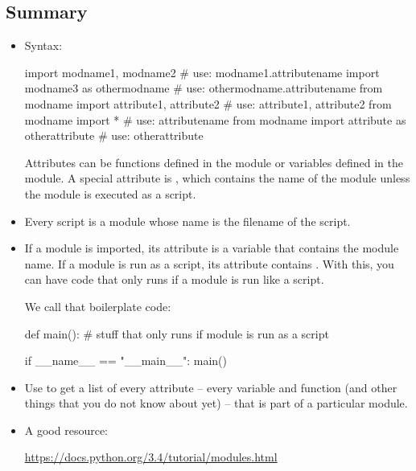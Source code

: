 \documentclass[11pt]{cselabheader}
\begin{document}
{\pagebreak
\subsection{Summary}
\label{subsec:modules.sum}

\begin{itemize}
  \item Syntax:

    \begin{python3code}
import modname1, modname2 # use: modname1.attributename
import modname3 as othermodname # use: othermodname.attributename
from modname import attribute1, attribute2 # use: attribute1, attribute2
from modname import * # use: attributename
from modname import attribute as otherattribute # use: otherattribute
    \end{python3code}

    Attributes can be functions defined in the module or variables defined in
    the module. A special attribute is , which contains
    the name of the module unless the module is executed as a script.

  \item Every script is a module whose name is the filename of the script.

  \item If a module is imported, its  attribute is a
    variable that contains the module name. If a module is run as a script, its
     attribute contains . With
    this, you can have code that only runs if a module is run like a script.

    We call that boilerplate code:

    \begin{python3code}
def main():
    # stuff that only runs if module is run as a script

if __name__ == "__main__":
    main()
    \end{python3code}

  \item Use  to get a list of every attribute -- every
    variable and function (and other things that you do not know about yet) --
    that is part of a particular module.

  \item A good resource:

    \begin{center}
      \url{https://docs.python.org/3.4/tutorial/modules.html}
    \end{center}


\end{itemize}}
\end{document}
